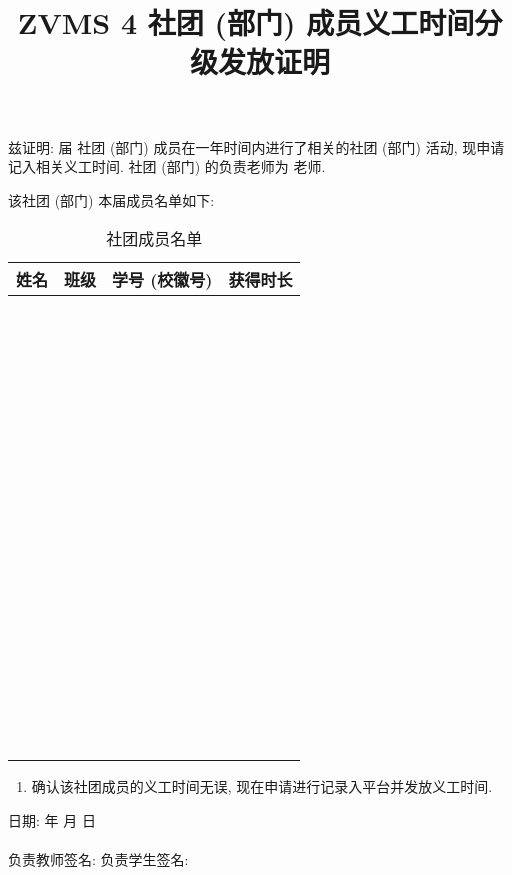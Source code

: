 \documentclass{article}
\title{ZVMS 4 社团 (部门) 成员义工时间分级发放证明}
\date{}
\begin{document}
\maketitle

兹证明: \underline{\hspace{3em}} 届 \underline{\hspace{5em}} 社团 (部门) 成员在一年时间内进行了相关的社团 (部门) 活动, 现申请记入相关义工时间. 社团 (部门) 的负责老师为 \underline{\hspace{5em}} 老师.

该社团 (部门) 本届成员名单如下:

\begin{table}[H]
  \centering
  \begin{tabular}{|c|c|c|c|}
    \hline
    \textbf{\hspace{2em}姓名\hspace{2em}} & \textbf{\hspace{2em}班级\hspace{2em}} & \textbf{\hspace{2em}学号 (校徽号)\hspace{2em}} & \textbf{\hspace{1em}获得时长\hspace{1em}} \\
    \hline
    ~&~&~&~\\\hline~&~&~&~\\\hline~&~&~&~\\\hline~&~&~&~\\\hline~&~&~&~\\\hline~&~&~&~\\\hline~&~&~&~\\\hline~&~&~&~\\\hline~&~&~&~\\\hline~&~&~&~\\\hline~&~&~&~\\\hline
    ~&~&~&~\\\hline~&~&~&~\\\hline~&~&~&~\\\hline~&~&~&~\\\hline~&~&~&~\\\hline
  \end{tabular}
  \caption{社团成员名单}
\end{table}

\begin{enumerate}[label=$\square$]
  \item 确认该社团成员的义工时间无误, 现在申请进行记录入平台并发放义工时间.
\end{enumerate}

\begin{flushright}
  日期: \underline{\hspace{4em}} 年 \underline{\hspace{2em}} 月 \underline{\hspace{2em}} 日
  ~\\~\\
  负责教师签名: \underline{\hspace{6em}} \hspace{1em}
  负责学生签名: \underline{\hspace{6em}}
\end{flushright}
\end{document}

